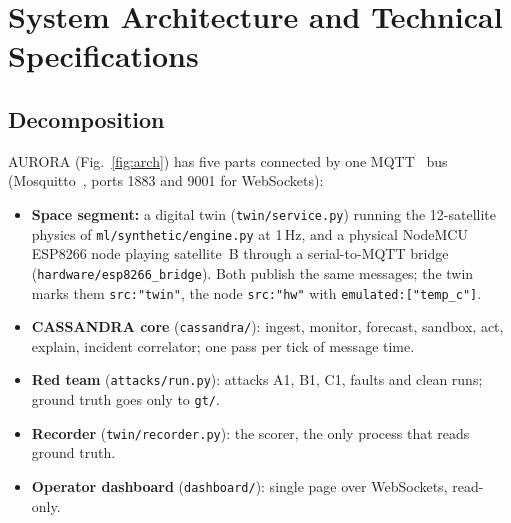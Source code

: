 \documentclass[conference]{IEEEtran}
\newcommand{\file}[1]{\texttt{#1}}
\begin{document}
\section{System Architecture and Technical Specifications}
\label{sec:arch}

\subsection{Decomposition}
AURORA (Fig.~\ref{fig:arch}) has five parts connected by one MQTT~\cite{mqtt5} bus
(Mosquitto~\cite{light2017mosquitto}, ports 1883 and 9001 for WebSockets):
\begin{itemize}
\item \textbf{Space segment:} a digital twin (\file{twin/service.py}) running the 12-satellite physics
of \file{ml/synthetic/engine.py} at 1\,Hz, and a physical NodeMCU ESP8266 node playing satellite~B
through a serial-to-MQTT bridge (\file{hardware/esp8266\_bridge}). Both publish the same messages;
the twin marks them \texttt{src:"twin"}, the node \texttt{src:"hw"} with
\texttt{emulated:["temp\_c"]}.
\item \textbf{CASSANDRA core} (\file{cassandra/}): ingest, monitor, forecast, sandbox, act, explain,
incident correlator; one pass per tick of message time.
\item \textbf{Red team} (\file{attacks/run.py}): attacks A1, B1, C1, faults and clean runs; ground
truth goes only to \texttt{gt/}.
\item \textbf{Recorder} (\file{twin/recorder.py}): the scorer, the only process that reads
ground truth.
\item \textbf{Operator dashboard} (\file{dashboard/}): single page over WebSockets, read-only.
\end{itemize}
\end{document}
